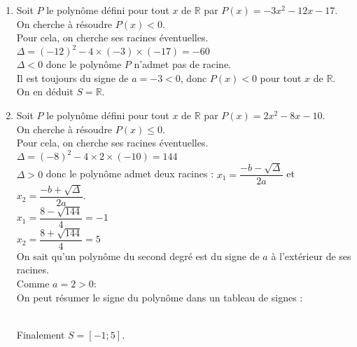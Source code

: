 \documentclass[a4paper,11pt,exos]{nsi} %
\begin{document}
\begin{enumerate}
    \item Soit $P$ le polynôme défini pour tout $x$ de $\mathbb R$ par $P(x)=-3x^2-12x-17$.\\On cherche à résoudre $P(x)< 0$.\\Pour cela, on cherche ses racines éventuelles.\\$\Delta = (-12)^2-4\times(-3)\times(-17)=-60$\\$\Delta<0$ donc le polynôme $P$ n'admet pas de racine.\\ Il est toujours du signe de $a=-3<0$, donc $P(x)<0$ pour tout $x$ de $\mathbb{R}$.\\ On en déduit $S=\mathbb{R}$.
\item Soit $P$ le polynôme défini pour tout $x$ de $\mathbb R$ par $P(x)=2x^2-8x-10$.\\On cherche à résoudre $P(x)\leq 0$.\\Pour cela, on cherche ses racines éventuelles.\\$\Delta = (-8)^2-4\times2\times(-10)=144$\\$\Delta>0$ donc  le polynôme admet deux racines : $x_1 = \dfrac{-b-\sqrt{\Delta}}{2a}$ et $x_2 = \dfrac{-b+\sqrt{\Delta}}{2a}$.\\$x_1 =\dfrac{8-\sqrt{144}}{4}=-1$\\$x_2 =\dfrac{8+\sqrt{144}}{4}=5$\\On sait qu'un polynôme du second degré est du signe de $a$ à l'extérieur de ses racines.\\Comme $a=2>0 :$\\On peut résumer le signe du polynôme dans un tableau de signes :\\[.5em]
\\ 

Finalement $S=[-1;5]$.    
\end{enumerate}
\end{document}
